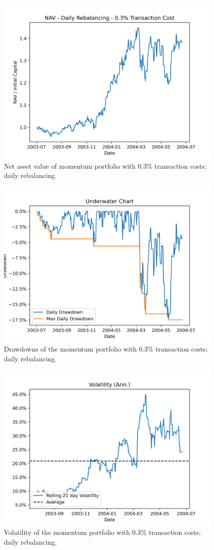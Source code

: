 \documentclass[12pt, oneside, a4paper]{article}
\begin{document}
\begin{figure}
\centering
\includegraphics[width=0.7\linewidth]{./figures/nav_mom.png}
\caption{Net asset value of momentum portfolio with 0.3\% transaction costs; daily rebalancing.}
\label{figure:Mom NAV}
\end{figure}

\begin{figure}
\centering
\includegraphics[width=0.7\linewidth]{./figures/underwater_mom.png}
\caption{Drawdowns of the momentum portfolio with 0.3\% transaction costs; daily rebalancing.}
\label{figure:Mom underwater}
\end{figure}

\begin{figure}
\centering
\includegraphics[width=0.7\linewidth]{./figures/volatility_mom.png}
\caption{Volatility of the momentum portfolio with 0.3\% transaction costs; daily rebalancing.}
\label{figure:Mom volatility}
\end{figure}
\end{document}
